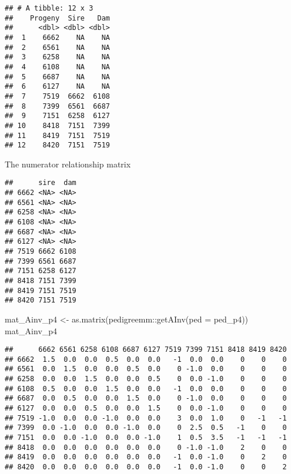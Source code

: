 \documentclass[
]{article}
\newenvironment{Shaded}{\begin{snugshade}}{\end{snugshade}}
\newcommand{\AttributeTok}[1]{\textcolor[rgb]{0.77,0.63,0.00}{#1}}
\newcommand{\FunctionTok}[1]{\textcolor[rgb]{0.00,0.00,0.00}{#1}}
\newcommand{\NormalTok}[1]{#1}
\newcommand{\OtherTok}[1]{\textcolor[rgb]{0.56,0.35,0.01}{#1}}
\newcommand{\SpecialCharTok}[1]{\textcolor[rgb]{0.00,0.00,0.00}{#1}}
\begin{document}
\begin{verbatim}
## # A tibble: 12 x 3
##    Progeny  Sire   Dam
##      <dbl> <dbl> <dbl>
##  1    6662    NA    NA
##  2    6561    NA    NA
##  3    6258    NA    NA
##  4    6108    NA    NA
##  5    6687    NA    NA
##  6    6127    NA    NA
##  7    7519  6662  6108
##  8    7399  6561  6687
##  9    7151  6258  6127
## 10    8418  7151  7399
## 11    8419  7151  7519
## 12    8420  7151  7519
\end{verbatim}

The numerator relationship matrix

\begin{Shaded}
\end{Shaded}

\begin{verbatim}
##      sire  dam
## 6662 <NA> <NA>
## 6561 <NA> <NA>
## 6258 <NA> <NA>
## 6108 <NA> <NA>
## 6687 <NA> <NA>
## 6127 <NA> <NA>
## 7519 6662 6108
## 7399 6561 6687
## 7151 6258 6127
## 8418 7151 7399
## 8419 7151 7519
## 8420 7151 7519
\end{verbatim}

\begin{Shaded}
\begin{Highlighting}[]
\NormalTok{mat\_Ainv\_p4 }\OtherTok{\textless{}{-}} \FunctionTok{as.matrix}\NormalTok{(pedigreemm}\SpecialCharTok{::}\FunctionTok{getAInv}\NormalTok{(}\AttributeTok{ped =}\NormalTok{ ped\_p4))}
\NormalTok{mat\_Ainv\_p4}
\end{Highlighting}
\end{Shaded}

\begin{verbatim}
##      6662 6561 6258 6108 6687 6127 7519 7399 7151 8418 8419 8420
## 6662  1.5  0.0  0.0  0.5  0.0  0.0   -1  0.0  0.0    0    0    0
## 6561  0.0  1.5  0.0  0.0  0.5  0.0    0 -1.0  0.0    0    0    0
## 6258  0.0  0.0  1.5  0.0  0.0  0.5    0  0.0 -1.0    0    0    0
## 6108  0.5  0.0  0.0  1.5  0.0  0.0   -1  0.0  0.0    0    0    0
## 6687  0.0  0.5  0.0  0.0  1.5  0.0    0 -1.0  0.0    0    0    0
## 6127  0.0  0.0  0.5  0.0  0.0  1.5    0  0.0 -1.0    0    0    0
## 7519 -1.0  0.0  0.0 -1.0  0.0  0.0    3  0.0  1.0    0   -1   -1
## 7399  0.0 -1.0  0.0  0.0 -1.0  0.0    0  2.5  0.5   -1    0    0
## 7151  0.0  0.0 -1.0  0.0  0.0 -1.0    1  0.5  3.5   -1   -1   -1
## 8418  0.0  0.0  0.0  0.0  0.0  0.0    0 -1.0 -1.0    2    0    0
## 8419  0.0  0.0  0.0  0.0  0.0  0.0   -1  0.0 -1.0    0    2    0
## 8420  0.0  0.0  0.0  0.0  0.0  0.0   -1  0.0 -1.0    0    0    2
\end{verbatim}
\end{document}
